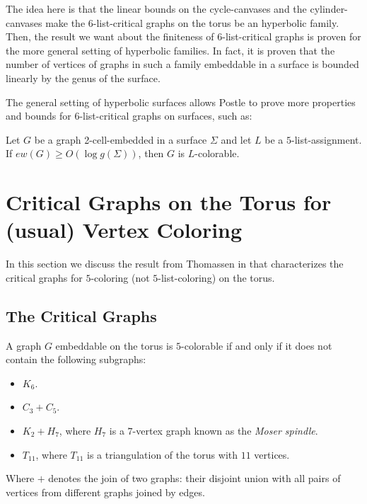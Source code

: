 The idea here is that the linear bounds on the cycle-canvases and the cylinder-canvases make the 
$6$-list-critical graphs on the torus be an hyperbolic family. Then, the result we want about
the finiteness of $6$-list-critical graphs is proven for the more general setting of hyperbolic
families. In fact, it is proven that the number of vertices of
graphs in such a family embeddable in a surface is bounded linearly by the genus 
of the surface.

The general setting of hyperbolic surfaces allows Postle to prove more properties and bounds for
$6$-list-critical graphs on surfaces, such as:

\begin{theorem}
\label{edgewidththeorem}
Let $G$ be a graph 2-cell-embedded in a surface $\Sigma$ and let $L$ be a $5$-list-assignment.
If $ew(G) \geq O(\log g(\Sigma))$, then $G$ is $L$-colorable. 

\end{theorem}





\section{Critical Graphs on the Torus for (usual) Vertex Coloring}

In this section we discuss the result from Thomassen in \cite{thomassentorus} that characterizes the critical graphs for $5$-coloring (not $5$-list-coloring) on the torus.

\subsection{The Critical Graphs}

\begin{theorem}
	\label{thomassentorustheorem}
	A graph $G$ embeddable on the torus is $5$-colorable if and only if 
	it does not contain the following subgraphs:
	\begin{itemize}
		\item $K_6$.
		\item $C_3 + C_5$.
		\item $K_2 + H_7$, where $H_7$ is a $7$-vertex graph known as the \emph{Moser spindle}.
		\item $T_{11}$, where $T_{11}$ is a triangulation of the torus with $11$ vertices.
	\end{itemize}
	Where $+$ denotes the join of two graphs: their disjoint union with 
	all pairs of vertices from different graphs joined by edges.
\end{theorem} 


